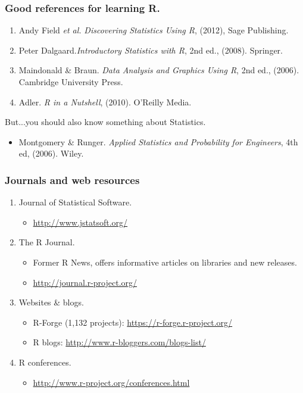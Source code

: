 \documentclass{beamer}
\begin{document}
\begin{frame}

 \frametitle{Good references for learning R.}
 \begin{enumerate}
  \item Andy Field \textit{et al.} \textit{Discovering Statistics Using R}, (2012), Sage Publishing.
  \item Peter Dalgaard.\textit{Introductory Statistics with R}, 2nd ed., (2008). Springer.
  \item Maindonald \& Braun. \textit{Data Analysis and Graphics Using R}, 2nd ed., (2006).
  Cambridge University Press.
  \item Adler. \textit{R in a Nutshell}, (2010). O'Reilly Media.
  
 \end{enumerate}
 But...you should also know something about Statistics.
 \begin{itemize}
  \item Montgomery \& Runger. \textit{Applied Statistics and Probability for Engineers},
  4th ed, (2006). Wiley.
 \end{itemize}

\end{frame}


\begin{frame}

 \frametitle{Journals and web resources}
 \begin{enumerate}

  \item Journal of Statistical Software.
  \begin{itemize}
    \item \url{http://www.jstatsoft.org/}
  \end{itemize}

  \item The R Journal.
    \begin{itemize}
      \item Former R News, offers informative articles on libraries and
      new releases.
      \item \url{http://journal.r-project.org/}
    \end{itemize}

   \item Websites \& blogs.
    \begin{itemize}
      \item R-Forge (1,132 projects): \url{https://r-forge.r-project.org/}
      \item R blogs: \url{http://www.r-bloggers.com/blogs-list/}
    \end{itemize}

   \item R conferences.
     \begin{itemize}
      \item \url{http://www.r-project.org/conferences.html}
     \end{itemize}


 \end{enumerate}

\end{frame}

\end{document}
